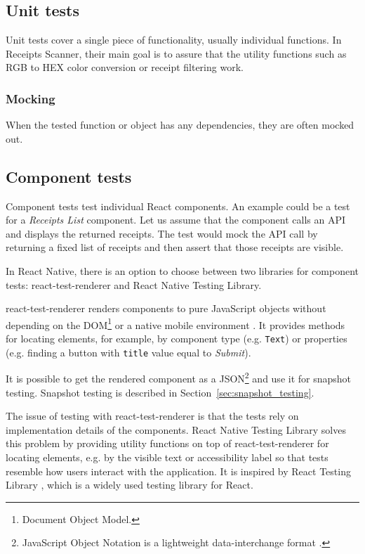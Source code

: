 \documentclass[
  printed, %
  table,   %
  oneside, %
  lof,     %
  lot,     %
]{fithesis3}
\begin{document}
\subsection{Unit tests}
Unit tests cover a single piece of functionality, usually individual functions. In Receipts Scanner, their main goal is to assure that the utility functions such as RGB to HEX color conversion or receipt filtering work.

\subsubsection{Mocking}
When the tested function or object has any dependencies, they are often mocked out.

\subsection{Component tests}
Component tests test individual React components. An example could be a test for a \textit{Receipts List} component. Let us assume that the component calls an API and displays the returned receipts. The test would mock the API call by returning a fixed list of receipts and then assert that those receipts are visible. 

In React Native, there is an option to choose between two libraries for component tests: react-test-renderer and React Native Testing Library. 

react-test-renderer renders components to pure JavaScript objects without depending on the DOM\footnote{Document Object Model.} or a native mobile environment \cite{ReactTestRenderer}. It provides methods for locating elements, for example, by component type (e.g. \texttt{Text}) or properties (e.g. finding a button with \texttt{title} value equal to \textit{Submit}).

It is possible to get the rendered component as a JSON\footnote{JavaScript Object Notation is a lightweight data-interchange format \cite{Ecma2017JSON}.} and use it for snapshot testing. Snapshot testing is described in Section~\ref{sec:snapshot_testing}.

The issue of testing with react-test-renderer is that the tests rely on implementation details of the components. React Native Testing Library solves this problem by providing utility functions on top of react-test-renderer \cite{ReactNativeTestingLibrary} for locating elements, e.g. by the visible text or accessibility label so that tests resemble how users interact with the application. It is inspired by React Testing Library \cite{ReactNativeTestingLibrary}, which is a widely used testing library for React.
\end{document}
